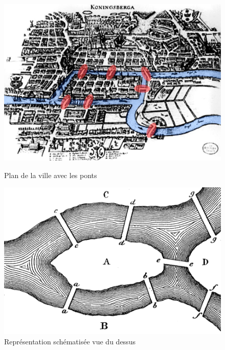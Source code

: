 \begin{figure}[h]
    \begin{minipage}[c]{.32\linewidth}
        \centering
        \includegraphics[height=0.7\textwidth]{images/ponts_rouge.jpg}
        \caption{Plan de la ville avec les ponts}
        \label{image1}
    \end{minipage}
    \hfill%
    \begin{minipage}[c]{.32\linewidth}
        \centering
        \includegraphics[height=0.7\textwidth]{images/lucas_ch2_fig1_50pc}
        \caption{Représentation schématisée vue du dessus}
    \end{minipage}
    \hfill%
    \begin{minipage}[c]{.32\linewidth}
        \centering

\end{minipage}
\end{figure}

